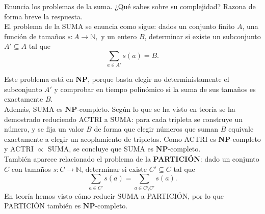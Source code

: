 \documentclass[12pt]{article}
\begin{document}
    \begin{ejercicio}[1.3 puntos]
        Enuncia los problemas de la suma. ¿Qué sabes sobre su complejidad? Razona de forma breve la respuesta. \\

        El problema de la SUMA se enuncia como sigue: dados un conjunto finito $A$, una función de tamaños
        $
        s:A\to \mathbb{N},
        $
        y un entero $B$, determinar si existe un subconjunto $A'\subseteq A$ tal que
        $$
        \sum_{a\in A'} s(a)=B.
        $$

        Este problema está en $\textbf{NP}$, porque basta elegir no deterministamente el subconjunto
        $A'$ y comprobar en tiempo polinómico si la suma de sus tamaños es exactamente $B$. \\

        Además, SUMA es $\textbf{NP}$-completo. Según lo que se ha visto en teoría se ha demostrado reduciendo
        ACTRI a SUMA: para cada tripleta se construye un número, y se fija un valor $B$ de forma
        que elegir números que suman $B$ equivale exactamente a elegir un acoplamiento de tripletas.
        Como ACTRI es $\textbf{NP}$-completo y ACTRI $\propto$ SUMA, se concluye que SUMA es
        $\textbf{NP}$-completo. \\

        También aparece relacionado el problema de la \textbf{PARTICIÓN}: dado un conjunto $C$ con
        tamaños $s:C\to\mathbb{N}$, determinar si existe $C'\subseteq C$ tal que
        $$
        \sum_{a\in C'}s(a)=\sum_{a\in C\setminus C'}s(a).
        $$
        En teoría hemos visto cómo reducir SUMA a PARTICIÓN, por lo que PARTICIÓN también es
        $\textbf{NP}$-completo.
    \end{ejercicio}

    \newpage
\end{document}

